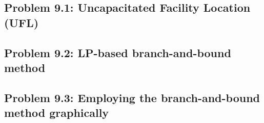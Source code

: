 \subsection*{Problem 9.1: Uncapacitated Facility Location (UFL)}


\pagebreak
\subsection*{Problem 9.2: LP-based branch-and-bound method}



\subsection*{Problem 9.3: Employing the branch-and-bound method graphically}






